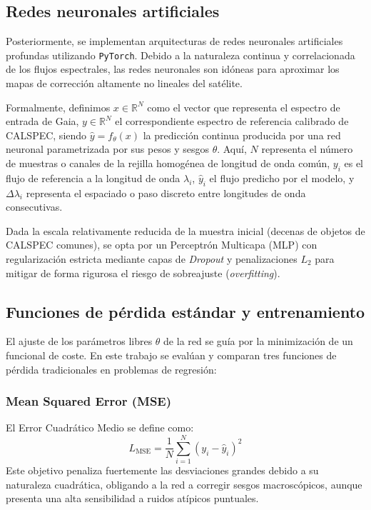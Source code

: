 \documentclass{article}
\begin{document}
\subsection{Redes neuronales artificiales}

\begin{sloppypar}
Posteriormente, se implementan arquitecturas de redes neuronales artificiales profundas utilizando \texttt{PyTorch}. Debido a la naturaleza continua y correlacionada de los flujos espectrales, las redes neuronales son idóneas para aproximar los mapas de corrección altamente no lineales del satélite.
\end{sloppypar}

Formalmente, definimos $x \in \mathbb{R}^{N}$ como el vector que representa el espectro de entrada de Gaia, $y \in \mathbb{R}^{N}$ el correspondiente espectro de referencia calibrado de CALSPEC, siendo $\hat{y} = f_{\theta}(x)$ la predicción continua producida por una red neuronal parametrizada por sus pesos y sesgos $\theta$. Aquí, $N$ representa el número de muestras o canales de la rejilla homogénea de longitud de onda común, $y_i$ es el flujo de referencia a la longitud de onda $\lambda_i$, $\hat{y}_i$ el flujo predicho por el modelo, y $\Delta\lambda_i$ representa el espaciado o paso discreto entre longitudes de onda consecutivas.

Dada la escala relativamente reducida de la muestra inicial (decenas de objetos de CALSPEC comunes), se opta por un Perceptrón Multicapa (MLP) con regularización estricta mediante capas de \textit{Dropout} y penalizaciones $L_2$ para mitigar de forma rigurosa el riesgo de sobreajuste (\textit{overfitting}).

\subsection{Funciones de pérdida estándar y entrenamiento}

El ajuste de los parámetros libres $\theta$ de la red se guía por la minimización de un funcional de coste. En este trabajo se evalúan y comparan tres funciones de pérdida tradicionales en problemas de regresión:

\subsubsection{Mean Squared Error (MSE)}
El Error Cuadrático Medio se define como:
\begin{equation}
L_{\mathrm{MSE}} = \frac{1}{N} \sum_{i=1}^{N} \left(y_i-\hat{y}_i\right)^2
\end{equation}
Este objetivo penaliza fuertemente las desviaciones grandes debido a su naturaleza cuadrática, obligando a la red a corregir sesgos macroscópicos, aunque presenta una alta sensibilidad a ruidos atípicos puntuales.
\end{document}

